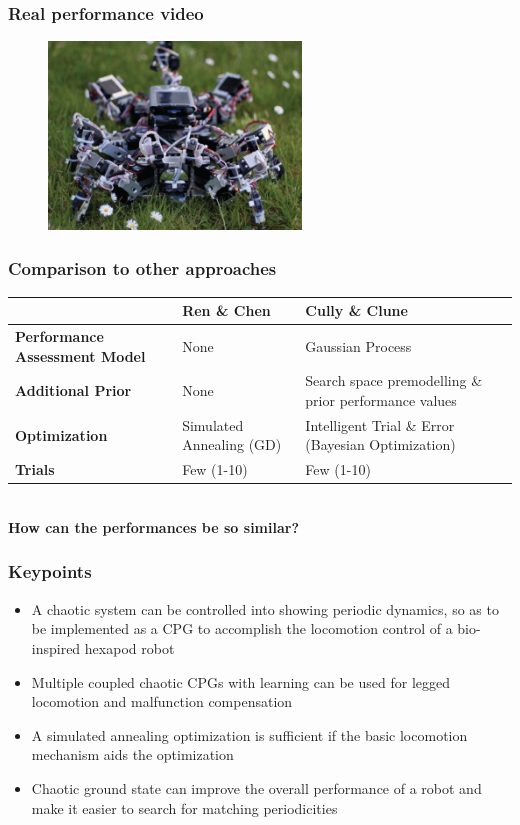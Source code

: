 \documentclass{beamer}
\begin{document}
\begin{frame}
\frametitle{Real performance video}
\begin{figure}
\center
\href{run:figs/videos/supple_video.wmv}{\includegraphics[width=0.6\textwidth]{figs/AMOS.jpg}}
\end{figure}
\end{frame}

\begin{frame}
\frametitle{Comparison to other approaches}
    \hspace*{-0.7cm}
  \centering
  \begin{tabular}{p{2.3cm}p{4.2cm}p{4.2cm}}
     & \textbf{Ren \& Chen} & \textbf{Cully \& Clune} \\
     \hline
    \textbf{Performance Assessment Model} & None & Gaussian Process \\
    \hline
    \textbf{Additional Prior} & None & Search space \newline premodelling \& \newline  prior performance values\\
    \hline
    \textbf{Optimization} & Simulated Annealing (GD) & Intelligent Trial \& Error \newline (Bayesian Optimization) \\
    \hline
    \textbf{Trials} & Few (1-10) & Few (1-10)
  \end{tabular}
  \\[1cm]
  \textbf{How can the performances be so similar?}
\end{frame}

\begin{frame}
\frametitle{Keypoints}
\begin{itemize}
\item A chaotic system can be controlled into showing periodic dynamics, so as to be implemented as a CPG to accomplish the locomotion control of a bio-inspired hexapod robot
\item Multiple coupled chaotic CPGs with learning can be used for legged locomotion and malfunction compensation
\item A simulated annealing optimization is sufficient if the basic locomotion mechanism aids the optimization
\item Chaotic ground state can improve the overall performance of a robot and make it easier to search for matching periodicities
\end{itemize}
\end{frame}
\end{document}
